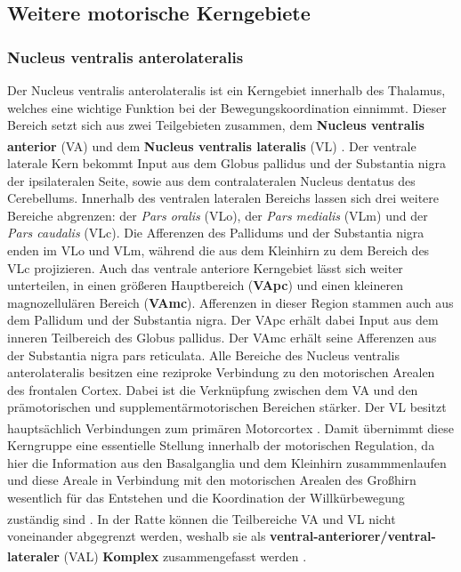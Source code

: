 \subsection{Weitere motorische Kerngebiete}
\subsubsection{Nucleus ventralis anterolateralis}  \label{subsubsec:ncl_anterolateralis}
Der Nucleus ventralis anterolateralis ist ein Kerngebiet innerhalb des Thalamus, welches eine wichtige Funktion bei der Bewegungskoordination einnimmt. Dieser Bereich setzt sich aus zwei Teilgebieten zusammen, dem \textbf{Nucleus ventralis anterior} (VA) und dem \textbf{Nucleus ventralis lateralis} (VL) \textsuperscript{\cite[Kap.~8]{trepel2011neuroanatomie}}. Der ventrale laterale Kern bekommt Input aus dem  Globus pallidus und der Substantia nigra der ipsilateralen Seite, sowie aus dem contralateralen Nucleus dentatus des Cerebellums. Innerhalb des ventralen lateralen Bereichs lassen sich drei weitere Bereiche abgrenzen: der \textit{Pars oralis} (VLo), der \textit{Pars medialis} (VLm) und der \textit{Pars caudalis} (VLc). Die Afferenzen des Pallidums und der Substantia nigra enden im VLo und VLm, während die aus dem Kleinhirn zu dem Bereich des VLc projizieren. Auch das ventrale anteriore Kerngebiet lässt sich weiter unterteilen, in einen größeren Hauptbereich (\textbf{VApc}) und einen kleineren magnozellulären Bereich (\textbf{VAmc}). Afferenzen in dieser Region stammen auch aus dem Pallidum und der Substantia nigra. Der VApc erhält dabei Input aus dem inneren Teilbereich des Globus pallidus. Der VAmc erhält seine Afferenzen aus der Substantia nigra pars reticulata. Alle Bereiche des Nucleus ventralis anterolateralis besitzen eine reziproke Verbindung zu den motorischen Arealen des frontalen Cortex. Dabei ist die Verknüpfung zwischen dem VA und den prämotorischen und supplementärmotorischen Bereichen stärker. Der VL besitzt hauptsächlich Verbindungen zum primären Motorcortex \textsuperscript{\cite[Kap.~12]{crossman2014neuroanatomy}}. Damit übernimmt diese Kerngruppe eine essentielle Stellung innerhalb der motorischen Regulation, da hier die Information aus den Basalganglia und dem Kleinhirn zusammmenlaufen und diese Areale in Verbindung mit den motorischen Arealen des Großhirn wesentlich für das Entstehen und die Koordination der Willkürbewegung zuständig sind \textsuperscript{\cite[Kap.~8]{trepel2011neuroanatomie}}. In der Ratte können die Teilbereiche VA und VL nicht voneinander abgegrenzt werden, weshalb sie als \textbf{ventral-anteriorer/ventral-lateraler} (VAL) \textbf{Komplex} zusammengefasst werden \textsuperscript{\cite[Kap.~16]{paxinos2014rat}}.     

